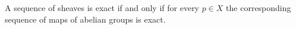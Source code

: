 A sequence of sheaves is exact if and only if for every $p \in X$ the corresponding
sequence of maps of abelian groups is exact.
